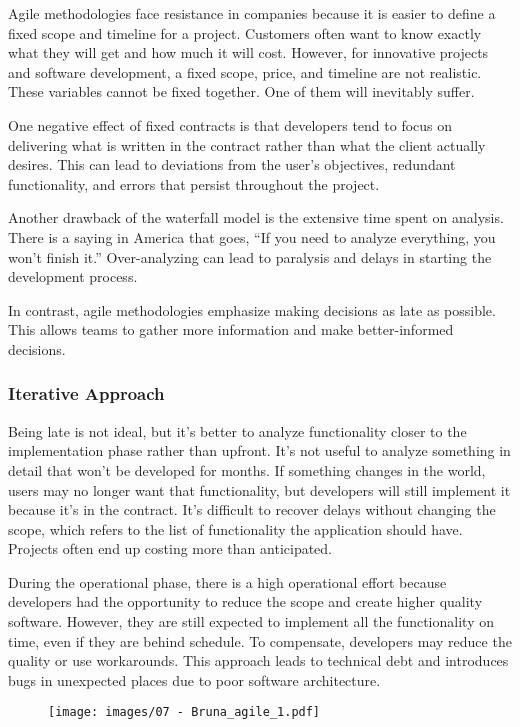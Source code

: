 Agile methodologies face resistance in companies because it is easier to
define a fixed scope and timeline for a project. Customers often want to
know exactly what they will get and how much it will cost. However, for
innovative projects and software development, a fixed scope, price, and
timeline are not realistic. These variables cannot be fixed together.
One of them will inevitably suffer.

One negative effect of fixed contracts is that developers tend to focus
on delivering what is written in the contract rather than what the
client actually desires. This can lead to deviations from the user's
objectives, redundant functionality, and errors that persist throughout
the project.

Another drawback of the waterfall model is the extensive time spent on
analysis. There is a saying in America that goes, ``If you need to
analyze everything, you won't finish it.'' Over-analyzing can lead to
paralysis and delays in starting the development process.

In contrast, agile methodologies emphasize making decisions as late as
possible. This allows teams to gather more information and make
better-informed decisions.

\subsubsection{Iterative Approach}

Being late is not ideal, but it's better to analyze functionality closer
to the implementation phase rather than upfront. It's not useful to
analyze something in detail that won't be developed for months. If
something changes in the world, users may no longer want that
functionality, but developers will still implement it because it's in
the contract. It's difficult to recover delays without changing the
scope, which refers to the list of functionality the application should
have. Projects often end up costing more than anticipated.

During the operational phase, there is a high operational effort because
developers had the opportunity to reduce the scope and create higher
quality software. However, they are still expected to implement all the
functionality on time, even if they are behind schedule. To compensate,
developers may reduce the quality or use workarounds. This approach
leads to technical debt and introduces bugs in unexpected places due to
poor software architecture.

\begin{figure}[!h]
  \centering
  \texttt{[image: images/07 - Bruna\_agile\_1.pdf]}
\end{figure}

